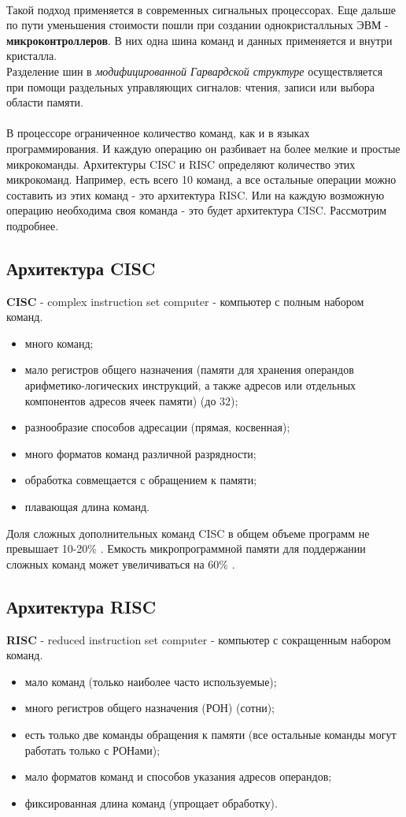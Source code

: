 \\Такой подход применяется в современных сигнальных процессорах. Еще дальше по пути уменьшения стоимости пошли при создании однокристалльных ЭВМ - \textbf{микроконтроллеров}. В них одна шина команд и данных применяется и внутри кристалла.
\\Разделение шин в \emph{модифицированной Гарвардской структуре} осуществляется при помощи раздельных управляющих сигналов: чтения, записи или выбора области памяти.
\\\\В процессоре ограниченное количество команд, как и в языках программирования. И каждую операцию он разбивает на более мелкие и простые микрокоманды. Архитектуры CISC и RISC определяют количество этих микрокоманд. Например, есть всего 10 команд, а все остальные операции можно составить из этих команд - это архитектура RISC. Или на каждую возможную операцию необходима своя команда - это будет архитектура CISC. Рассмотрим подробнее.
\subsection{Архитектура CISC}
\textbf{CISC} - complex instruction set computer - компьютер с полным набором команд.
\begin{itemize}
  \item много команд;
  \item мало регистров общего назначения (памяти для хранения операндов арифметико-логических инструкций, а также адресов или отдельных компонентов адресов ячеек памяти) (до 32);
  \item разнообразие способов адресации (прямая, косвенная);
  \item много форматов команд различной разрядности;
  \item обработка совмещается с обращением к памяти;
  \item плавающая длина команд.
\end{itemize}
Доля сложных дополнительных команд CISC в общем объеме программ не превышает 10-20\%
. Емкость микропрограммной памяти для поддержании сложных команд может увеличиваться на 60\%
.
\subsection{Архитектура RISC}
\textbf{RISC} - reduced instruction set computer - компьютер с сокращенным набором команд.
\begin{itemize}
  \item мало команд (только наиболее часто используемые);
  \item много регистров общего назначения (РОН) (сотни);
  \item есть только две команды обращения к памяти (все остальные команды могут работать только с РОНами);
  \item мало форматов команд и способов указания адресов операндов;
  \item фиксированная длина команд (упрощает обработку).
\end{itemize}
